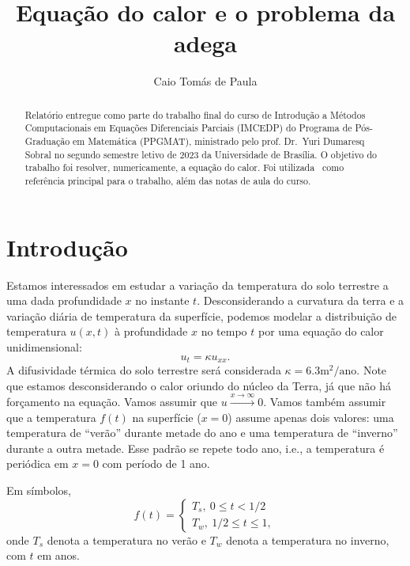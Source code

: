 \documentclass[twocolumn,showpacs,%
  nofootinbib,aps,superscriptaddress,%
  eqsecnum,prd,notitlepage,showkeys,10pt]{revtex4-1}
\renewcommand{\leq}{\leqslant}
\begin{document}
\title{
  Equação do calor e o problema da adega
}
\author{Caio Tomás de Paula}
%
\begin{abstract}
    Relatório entregue como parte do trabalho final do curso de Introdução a
    Métodos Computacionais em Equações Diferenciais Parciais (IMCEDP) do
    Programa de Pós-Graduação em Matemática (PPGMAT),
    ministrado pelo prof. Dr.~Yuri Dumaresq Sobral no segundo semestre letivo
    de 2023 da Universidade de Brasília.
    O objetivo do trabalho foi resolver, numericamente, a equação do calor.
    Foi utilizada~\cite{lin1998} como referência principal para o trabalho, além
    das notas de aula do curso.
\end{abstract}
%
\maketitle
%
\section{Introdução}
%
	Estamos interessados em estudar a variação da temperatura do solo terrestre a uma dada
	profundidade $x$ no instante $t$. Desconsiderando a curvatura da terra e a variação diária
	de temperatura da superfície, podemos modelar a distribuição de temperatura $u(x,t)$ à
	profundidade $x$ no tempo $t$ por uma equação do calor unidimensional:
	\begin{equation*}
		u_t = \kappa u_{xx}.
	\end{equation*}
	A difusividade térmica do solo terrestre será considerada $\kappa = 6.3\text{m}^2/\text{ano}$.
	Note que estamos desconsiderando o calor oriundo do núcleo da Terra, já que não há forçamento
	na equação. Vamos assumir que $u \xrightarrow{x\to\infty} 0$. Vamos também assumir que
	a temperatura $f(t)$ na superfície ($x = 0$) assume apenas dois valores: uma temperatura
	de ``verão'' durante metade do ano e uma temperatura de ``inverno'' durante a outra metade.
	Esse padrão se repete todo ano, i.e., a temperatura é periódica em $x=0$ com período de 1 ano.

	Em símbolos,
	\begin{equation*}
		f(t) = \begin{cases}
			T_s, \ 0 \leq t < 1/2 \\
			T_w, \ 1/2 \leq t \leq 1,
		\end{cases}
	\end{equation*}
	onde $T_s$ denota a temperatura no verão e $T_w$ denota a temperatura no inverno, com $t$ em anos.
\end{document}
